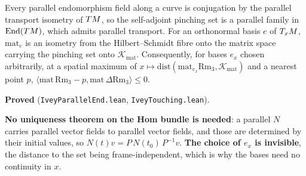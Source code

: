 \begin{lemma}
  \label{lem:ivey-touching}
  \leanok
  Every parallel endomorphism field along a curve is conjugation by the parallel transport
  isometry of $TM$, so the self-adjoint pinching set is a parallel family in
  $\operatorname{End}(TM)$, which admits parallel transport. For an orthonormal basis $e$ of
  $T_xM$, $\mathrm{mat}_e$ is an isometry from the Hilbert--Schmidt fibre onto the matrix space
  carrying the pinching set onto $\mathcal{K}_{\mathrm{mat}}$. Consequently, for bases $e_x$
  chosen arbitrarily, at a spatial maximum of $x\mapsto\mathrm{dist}(\mathrm{mat}_{e_x}\mathrm{Rm}_3,
  \mathcal{K}_{\mathrm{mat}})$ and a nearest point $p$,
  $\langle \mathrm{mat}\,\mathrm{Rm}_3 - p, \mathrm{mat}\,\Delta\mathrm{Rm}_3\rangle \le 0$.

  \textbf{Proved} (\texttt{IveyParallelEnd.lean}, \texttt{IveyTouching.lean}).

  \textbf{No uniqueness theorem on the Hom bundle is needed}: a parallel $N$ carries parallel
  vector fields to parallel vector fields, and those are determined by their initial values, so
  $N(t)v = P\,N(t_0)\,P^{-1}v$. \textbf{The choice of $e_x$ is invisible}, the distance to the
  set being frame-independent, which is why the bases need no continuity in $x$.
\end{lemma}


